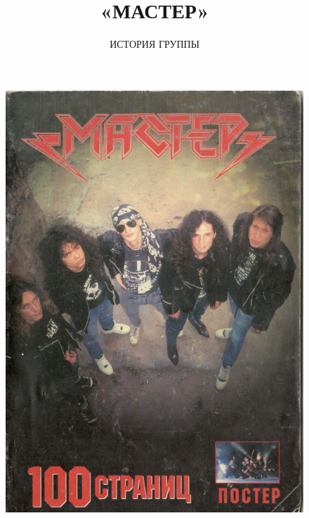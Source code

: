 \documentclass[10pt, twoside]{book}
\begin{document}
\title{«МАСТЕР»}
\author{ИСТОРИЯ ГРУППЫ}
\date{}


\begin{figure}[!ht]
    \centering
    \includegraphics[width=\paperwidth,height=\paperheight]{Cover1}
    \caption*{}
\end{figure}
\end{document}

